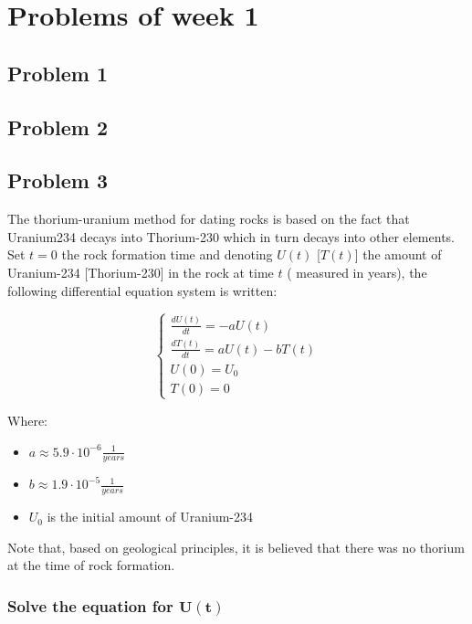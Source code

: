 \chapter{Problems of week 1}

\section{Problem 1}

\section{Problem 2}

\section{Problem 3}
The thorium-uranium method for dating rocks is based on the fact that Uranium234 decays into Thorium-230 which in turn decays into other elements.
Set $t = 0$ the rock formation time and denoting $U(t)$ [$T(t)$] the amount of Uranium-234 [Thorium-230] in the rock at time $t$ ( measured in years), the following differential equation system is written:

$$\begin{cases}
  \frac{dU(t)}{dt} = -aU(t) \\
  \frac{dT(t)}{dt} = aU(t) - bT(t) \\
  U(0) = U_0\\
  T(0) = 0
\end{cases}$$

Where:

\begin{multicols}{2}
  \begin{itemize}
    \item $a \approx 5.9 \cdot 10^{-6}\frac{1}{years}$
    \item $b \approx 1.9 \cdot 10^{-5}\frac{1}{years}$
    \item $U_0$ is the initial amount of Uranium-234
  \end{itemize}
\end{multicols}



Note that, based on geological principles, it is believed that there was no thorium at the time of rock formation.

  \subsection{Solve the equation for $\mathbf{U(t)}$}

